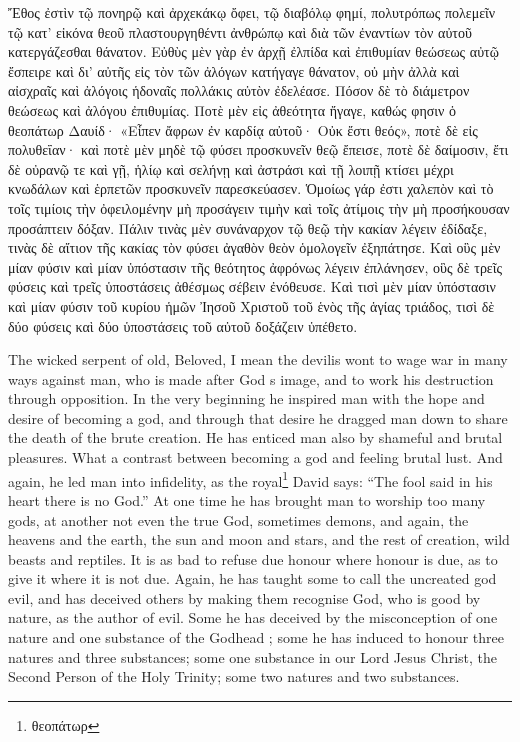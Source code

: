 \documentclass[10pt]{book}
\newcommand{\switchgreek}[1][]{\selectlanguage{polutonikogreek} \switchcolumn*[#1]}
\newcommand{\switchenglish}{\selectlanguage{english} \switchcolumn}
\begin{document}
\begin{paracol}{2}
\switchgreek

Ἔθος ἐστὶν τῷ πονηρῷ καὶ ἀρχεκάκῳ ὄφει, τῷ διαβόλῳ φημί, πολυτρόπως πολεμεῖν
τῷ κατ’ εἰκόνα θεοῦ πλαστουργηθέντι ἀνθρώπῳ καὶ διὰ τῶν ἐναντίων τὸν αὐτοῦ
κατεργάζεσθαι θάνατον. Εὐθὺς μὲν γὰρ ἐν ἀρχῇ ἐλπίδα καὶ ἐπιθυμίαν θεώσεως αὐτῷ
ἔσπειρε καὶ δι’ αὐτῆς εἰς τὸν τῶν ἀλόγων κατήγαγε θάνατον, οὐ μὴν ἀλλὰ καὶ
αἰσχραῖς καὶ ἀλόγοις ἡδοναῖς πολλάκις αὐτὸν ἐδελέασε. Πόσον δὲ τὸ διάμετρον
θεώσεως καὶ ἀλόγου ἐπιθυμίας. Ποτὲ μὲν εἰς ἀθεότητα ἤγαγε, καθώς φησιν ὁ
θεοπάτωρ Δαυίδ· «Εἶπεν ἄφρων ἐν καρδίᾳ αὐτοῦ· Οὐκ ἔστι θεός», ποτὲ δὲ εἰς
πολυθεΐαν· καὶ ποτὲ μὲν μηδὲ τῷ φύσει προσκυνεῖν θεῷ ἔπεισε, ποτὲ δὲ δαίμοσιν,
ἔτι δὲ οὐρανῷ τε καὶ γῇ, ἡλίῳ καὶ σελήνῃ καὶ ἀστράσι καὶ τῇ λοιπῇ κτίσει μέχρι
κνωδάλων καὶ ἑρπετῶν προσκυνεῖν παρεσκεύασεν. Ὁμοίως γάρ ἐστι χαλεπὸν καὶ τὸ
τοῖς τιμίοις τὴν ὀφειλομένην μὴ προσάγειν τιμὴν καὶ τοῖς ἀτίμοις τὴν μὴ
προσήκουσαν προσάπτειν δόξαν. Πάλιν τινὰς μὲν συνάναρχον τῷ θεῷ τὴν κακίαν
λέγειν ἐδίδαξε, τινὰς δὲ αἴτιον τῆς κακίας τὸν φύσει ἀγαθὸν θεὸν ὁμολογεῖν
ἐξηπάτησε. Καὶ οὓς μὲν μίαν φύσιν καὶ μίαν ὑπόστασιν τῆς θεότητος ἀφρόνως
λέγειν ἐπλάνησεν, οὓς δὲ τρεῖς φύσεις καὶ τρεῖς ὑποστάσεις ἀθέσμως σέβειν
ἐνόθευσε. Καὶ τισὶ μὲν μίαν ὑπόστασιν καὶ μίαν φύσιν τοῦ κυρίου ἡμῶν Ἰησοῦ
Χριστοῦ τοῦ ἑνὸς τῆς ἁγίας τριάδος, τισὶ δὲ δύο φύσεις καὶ δύο ὑποστάσεις τοῦ
αὐτοῦ δοξάζειν ὑπέθετο.

\switchenglish

The wicked serpent of old, Beloved, I mean 
the devil\textemdash is wont to wage war in many ways 
against man, who is made after God s image, 
and to work his destruction through opposition. 
In the very beginning he inspired man with the 
hope and desire of becoming a god, and through 
that desire he dragged man down to share the 
death of the brute creation. He has enticed 
man also by shameful and brutal pleasures. 
What a contrast between becoming a god and 
feeling brutal lust. And again, he led man 
into infidelity, as the royal\footnote{θεοπάτωρ} David 
says: ``The fool said in his heart there is no 
God.'' At one time he has brought man to 
worship too many gods, at another not even 
the true God, sometimes demons, and again, 
the heavens and the earth, the sun and moon 
and stars, and the rest of creation, wild beasts 
and reptiles. It is as bad to refuse due honour 
where honour is due, as to give it where it is 
not due. Again, he has taught some to call 
the uncreated god evil, and has deceived others 
by making them recognise God, who is good 
by nature, as the author of evil. Some he has 
deceived by the misconception of one nature 
and one substance of the Godhead ; some he 
has induced to honour three natures and three 
substances; some one substance in our Lord 
Jesus Christ, the Second Person of the Holy 
Trinity; some two natures and two substances. 


\end{paracol}
\end{document}
